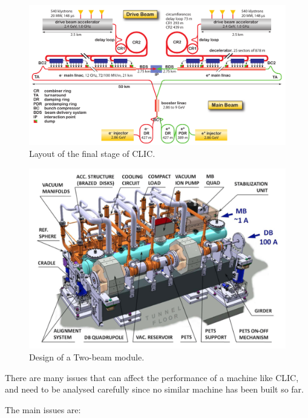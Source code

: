 \begin{figure}[h]
\centering

\includegraphics[scale=0.39]{pictures/CLIC_layout_3Tev}
\caption{Layout of the final stage of CLIC.}
\label{CLIC_layout}

\end{figure}

\begin{figure}

\includegraphics[scale=0.39]{pictures/TBM}
\caption{Design of a Two-beam module. }
\label{TBM}

\end{figure}







There are many issues that can affect the performance of a machine like CLIC, and need to be analysed carefully since no similar machine has been built so far. 

The main issues are:

